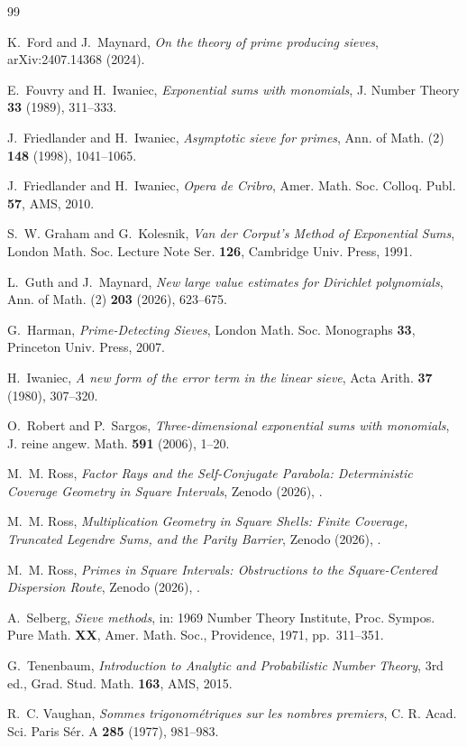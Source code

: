 \documentclass[11pt]{article}
\theoremstyle{remark}
\begin{document}
\begin{thebibliography}{99}

 K.~Ford and J.~Maynard,
\emph{On the theory of prime producing sieves},
arXiv:2407.14368 (2024).

 E.~Fouvry and H.~Iwaniec,
\emph{Exponential sums with monomials},
J. Number Theory \textbf{33} (1989), 311--333.

 J.~Friedlander and H.~Iwaniec,
\emph{Asymptotic sieve for primes},
Ann. of Math. (2) \textbf{148} (1998), 1041--1065.

 J.~Friedlander and H.~Iwaniec,
\emph{Opera de Cribro},
Amer. Math. Soc. Colloq. Publ. \textbf{57}, AMS, 2010.

 S.~W. Graham and G.~Kolesnik,
\emph{Van der Corput's Method of Exponential Sums},
London Math. Soc. Lecture Note Ser. \textbf{126}, Cambridge Univ. Press, 1991.

 L.~Guth and J.~Maynard,
\emph{New large value estimates for Dirichlet polynomials},
Ann. of Math. (2) \textbf{203} (2026), 623--675.

 G.~Harman,
\emph{Prime-Detecting Sieves},
London Math. Soc. Monographs \textbf{33}, Princeton Univ. Press, 2007.

 H.~Iwaniec,
\emph{A new form of the error term in the linear sieve},
Acta Arith. \textbf{37} (1980), 307--320.

 O.~Robert and P.~Sargos,
\emph{Three-dimensional exponential sums with monomials},
J. reine angew. Math. \textbf{591} (2006), 1--20.

 M.~M. Ross,
\emph{Factor Rays and the Self-Conjugate Parabola: Deterministic Coverage Geometry in
Square Intervals},
Zenodo (2026), .

 M.~M. Ross,
\emph{Multiplication Geometry in Square Shells: Finite Coverage, Truncated Legendre
Sums, and the Parity Barrier},
Zenodo (2026), .

 M.~M. Ross,
\emph{Primes in Square Intervals: Obstructions to the Square-Centered Dispersion Route},
Zenodo (2026), .

 A.~Selberg,
\emph{Sieve methods},
in: 1969 Number Theory Institute, Proc. Sympos. Pure Math. \textbf{XX},
Amer. Math. Soc., Providence, 1971, pp.~311--351.

 G.~Tenenbaum,
\emph{Introduction to Analytic and Probabilistic Number Theory}, 3rd ed.,
Grad. Stud. Math. \textbf{163}, AMS, 2015.

 R.~C. Vaughan,
\emph{Sommes trigonom\'etriques sur les nombres premiers},
C. R. Acad. Sci. Paris S\'er. A \textbf{285} (1977), 981--983.

\end{thebibliography}
\end{document}
